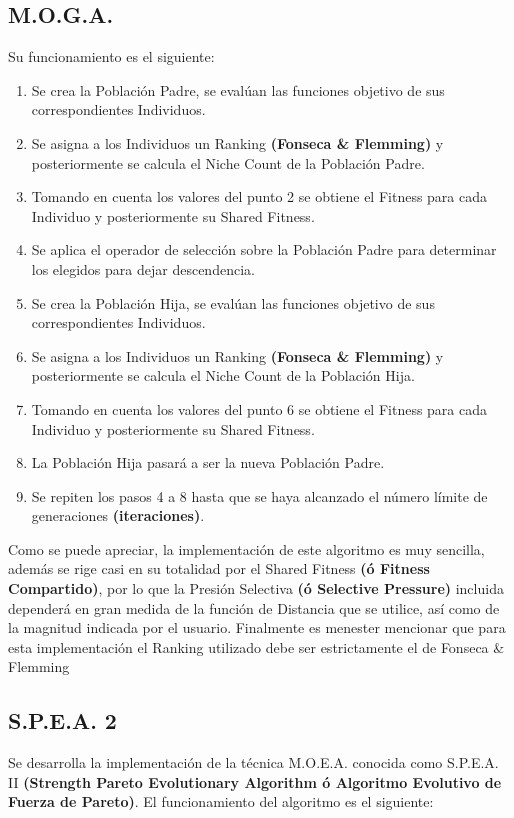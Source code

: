 \documentclass[class=report, crop=false]{standalone}
\begin{document}
\subsection{M.O.G.A.}
Su funcionamiento es el siguiente:

\begin{enumerate} 
\item Se crea la Población Padre, se evalúan las funciones objetivo de sus correspondientes Individuos.
\item Se asigna a los Individuos un Ranking \textbf{(Fonseca \& Flemming)} y posteriormente se calcula el Niche Count de la Población Padre.
\item Tomando en cuenta los valores del punto 2 se obtiene el Fitness para cada Individuo y posteriormente su Shared Fitness.
\item Se aplica el operador de selección sobre la Población Padre para determinar los elegidos para dejar descendencia.
\item Se crea la Población Hija, se evalúan las funciones objetivo de sus correspondientes Individuos.
\item Se asigna a los Individuos un Ranking \textbf{(Fonseca \& Flemming)} y posteriormente se calcula el Niche Count de la Población Hija.
\item Tomando en cuenta los valores del punto 6 se obtiene el Fitness para cada Individuo y posteriormente su Shared Fitness.
\item La Población Hija pasará a ser la nueva Población Padre.
\item Se repiten los pasos 4 a 8 hasta que se haya alcanzado el número límite de generaciones \textbf{(iteraciones)}.
\end{enumerate}

Como se puede apreciar, la implementación de este algoritmo es 
muy sencilla, además se rige casi en su totalidad por el 
Shared Fitness \textbf{(ó Fitness Compartido)}, por lo que 
la Presión Selectiva \textbf{(ó Selective Pressure)} incluida 
dependerá en gran medida de la función de Distancia que se utilice, 
así como de la magnitud indicada por el usuario.\medskip\break
Finalmente es menester mencionar que para esta implementación el 
Ranking utilizado debe ser estrictamente el de Fonseca \& Flemming 

\subsection{S.P.E.A. 2}
Se desarrolla la implementación de la técnica M.O.E.A. 
conocida como S.P.E.A. II \textbf{(Strength Pareto Evolutionary Algorithm ó Algoritmo Evolutivo de Fuerza de Pareto)}.\break
El funcionamiento del algoritmo es el siguiente:
\end{document}

